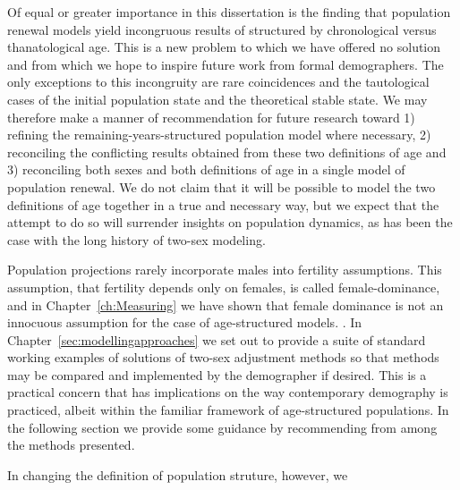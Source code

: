 Of equal or greater importance in this dissertation is the finding that
population renewal models yield incongruous results of structured by
chronological versus thanatological age. This is a new problem to 
which we have offered no solution and from which we hope to inspire future work
from formal demographers. The only exceptions to this incongruity are rare
coincidences and the tautological cases of the initial population state and the
theoretical stable state. We may therefore make a manner of recommendation for
future research toward 1) refining the remaining-years-structured population
model where necessary, 2) reconciling the conflicting results obtained from
these two definitions of age and 3) reconciling both sexes and both
definitions of age in a single model of population renewal. We do not claim that
it will be possible to model the two definitions of age together in a true and
necessary way, but we expect that the attempt to do so will surrender insights
on population dynamics, as has been the case with the long history of two-sex
modeling.

Population projections rarely incorporate males into fertility assumptions. This
assumption, that fertility depends only on females, is called female-dominance,
and in Chapter~\ref{ch:Measuring} we have shown that female dominance is not an
innocuous assumption for the case of age-structured models. . In
Chapter~\ref{sec:modellingapproaches} we set out to provide a suite of standard 
working examples of solutions of two-sex adjustment methods 
so that methods may be compared and implemented by the demographer if desired.
This is a practical concern that has implications on the way
contemporary demography is practiced, albeit within the familiar framework of
age-structured populations. In the following section we provide some
guidance by recommending from among the methods presented.

In changing the definition of population struture, however, we


